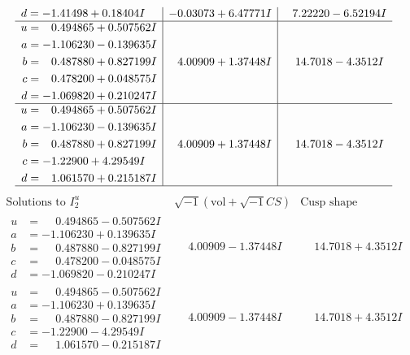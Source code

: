 \documentclass[1p]{elsarticle_modified}
\theoremstyle{definition}
\newcommand{\I}{\sqrt{-1}}
\begin{document}
$$\begin{array}{c|c|c}
\begin{aligned}
d &= -1.41498 + 0.18404 I\end{aligned}
 & -0.03073 + 6.47771 I & \phantom{-}7.22220 - 6.52194 I \\ \hline\begin{aligned}
u &= \phantom{-}0.494865 + 0.507562 I \\
a &= -1.106230 - 0.139635 I \\
b &= \phantom{-}0.487880 + 0.827199 I \\
c &= \phantom{-}0.478200 + 0.048575 I \\
d &= -1.069820 + 0.210247 I\end{aligned}
 & \phantom{-}4.00909 + 1.37448 I & \phantom{-}14.7018 - 4.3512 I \\ \hline\begin{aligned}
u &= \phantom{-}0.494865 + 0.507562 I \\
a &= -1.106230 - 0.139635 I \\
b &= \phantom{-}0.487880 + 0.827199 I \\
c &= -1.22900 + 4.29549 I \\
d &= \phantom{-}1.061570 + 0.215187 I\end{aligned}
 & \phantom{-}4.00909 + 1.37448 I & \phantom{-}14.7018 - 4.3512 I\\
 \hline 
 \end{array}$$\newpage$$\begin{array}{c|c|c}  
\text{Solutions to }I^u_{2}& \I (\text{vol} + \sqrt{-1}CS) & \text{Cusp shape}\\
 \hline 
\begin{aligned}
u &= \phantom{-}0.494865 - 0.507562 I \\
a &= -1.106230 + 0.139635 I \\
b &= \phantom{-}0.487880 - 0.827199 I \\
c &= \phantom{-}0.478200 - 0.048575 I \\
d &= -1.069820 - 0.210247 I\end{aligned}
 & \phantom{-}4.00909 - 1.37448 I & \phantom{-}14.7018 + 4.3512 I \\ \hline\begin{aligned}
u &= \phantom{-}0.494865 - 0.507562 I \\
a &= -1.106230 + 0.139635 I \\
b &= \phantom{-}0.487880 - 0.827199 I \\
c &= -1.22900 - 4.29549 I \\
d &= \phantom{-}1.061570 - 0.215187 I\end{aligned}
 & \phantom{-}4.00909 - 1.37448 I & \phantom{-}14.7018 + 4.3512 I \\ \hline\begin{aligned}

\end{aligned}
\end{array}$$
\end{document}
